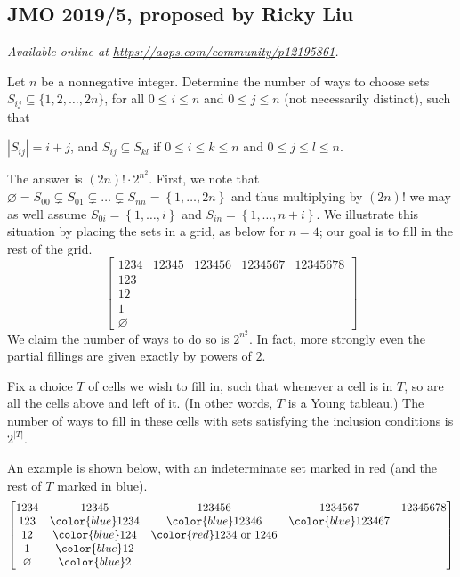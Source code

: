 \documentclass[11pt]{scrartcl}
\begin{document}
\subsection{JMO 2019/5, proposed by Ricky Liu}
\textsl{Available online at \url{https://aops.com/community/p12195861}.}
\begin{mdframed}[style=mdpurplebox,frametitle={Problem statement}]
Let $n$ be a nonnegative integer.
Determine the number of ways to choose sets
$S_{ij} \subseteq \{1, 2, \dots, 2n\}$,
for all $0 \le i \le n$ and $0 \le j \le n$
(not necessarily distinct), such that
\begin{itemize}
  \ii $|S_{ij}| = i+j$, and
  \ii $S_{ij} \subseteq S_{kl}$ if $0 \le i \le k \le n$
  and $0 \le j \le l \le n$.
\end{itemize}
\end{mdframed}
The answer is $(2n)! \cdot 2^{n^2}$.
First, we note that
$\varnothing = S_{00} \subsetneq S_{01} \subsetneq \dots \subsetneq S_{nn}
= \left\{ 1, \dots, 2n \right\}$
and thus multiplying by $(2n)!$
we may as well assume $S_{0i} = \left\{ 1, \dots, i \right\}$
and $S_{in} = \left\{ 1, \dots, n+i \right\}$.
We illustrate this situation by placing the sets in a grid,
as below for $n = 4$;
our goal is to fill in the rest of the grid.
\[
  \begin{bmatrix}
    1234 & 12345 & 123456 & 1234567 & 12345678\\
    123 \\
    12 \\
    1 \\
    \varnothing
  \end{bmatrix}
\]
We claim the number of ways to do so is $2^{n^2}$.
In fact, more strongly even the partial fillings
are given exactly by powers of $2$.
\begin{claim*}
  Fix a choice $T$ of cells we wish to fill in,
  such that whenever a cell is in $T$,
  so are all the cells above and left of it.
  (In other words, $T$ is a Young tableau.)
  The number of ways to fill in these cells with sets
  satisfying the inclusion conditions is $2^{|T|}$.
\end{claim*}
An example is shown below, with an indeterminate set marked in red
(and the rest of $T$ marked in blue).
\[
  \begin{bmatrix}
    1234 & 12345 & 123456 & 1234567 & 12345678\\
    123 & {\color{blue}1234} & {\color{blue}12346} & {\color{blue}123467} \\
    12 & {\color{blue}124} & {\color{red}1234 \text{ or } 1246} \\
    1 & {\color{blue}12} \\
    \varnothing & {\color{blue}2}
  \end{bmatrix}
\]
\end{document}
